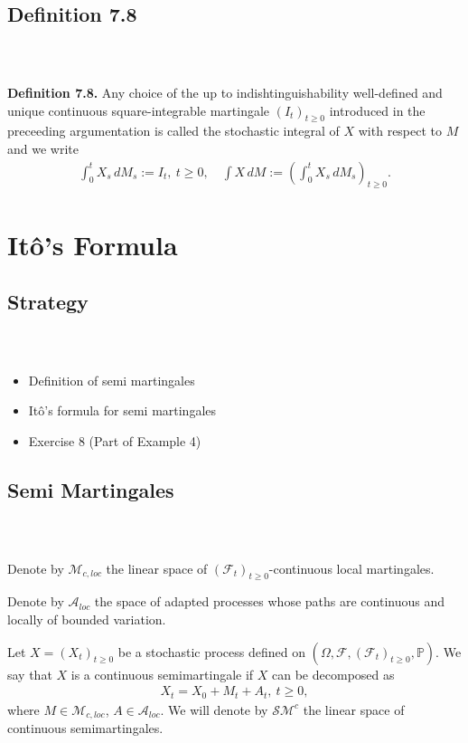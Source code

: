 \documentclass{beamer}
\numberwithin{equation}{section}
\newenvironment{frame2}{\begin{frame}\frametitle{{\normalsize \secname} \\ {\large \subsecname}}}{\end{frame}}
\begin{document}
\subsection{Definition 7.8}

\begin{frame2}
    \textbf{Definition 7.8.}
    Any choice of the up to indishtinguishability well-defined and unique continuous square-integrable martingale $(I_t)_{t \geq 0}$ introduced in the preceeding argumentation is called the stochastic integral of $X$ with respect to $M$ and we write
    \begin{align*}
        \int_0^t X_s \, dM_s := I_t, \ t \geq 0, \quad \int X \, dM := \left(\int_0^t X_s \, d M_s \right)_{t\geq 0}.
    \end{align*}    
\end{frame2}

\section{Itô's Formula}

\subsection{Strategy}
\begin{frame2}
    \begin{itemize}
        \item Definition of semi martingales
        \item Itô's formula for semi martingales
        \item Exercise 8 (Part of Example 4)
    \end{itemize}
\end{frame2}

\subsection{Semi Martingales}

\begin{frame2}
    Denote by $\mathcal{M}_{c,loc}$ the linear space of $(\mathcal{F}_t)_{t \geq 0}$-continuous local martingales.
    
    \vspace{10pt}
    Denote by $\mathcal{A}_{loc}$ the space of adapted processes whose paths are continuous and locally of bounded variation.

    \vspace{10pt}
    Let $X = (X_t)_{t \geq 0}$ be a stochastic process defined on $(\Omega, \mathcal{F},(\mathcal{F}_t)_{t \geq 0}, \mathbb{P})$.
    We say that $X$ is a continuous semimartingale if $X$ can be decomposed as
    \begin{align}
        X_t = X_0 + M_t + A_t, \ t \geq 0,
    \end{align}
    where $M \in \mathcal{M}_{c,loc}$, $A \in \mathcal{A}_{loc}$.
    We will denote by $\mathcal{SM}^c$ the linear space of continuous semimartingales.
\end{frame2}
\end{document}
